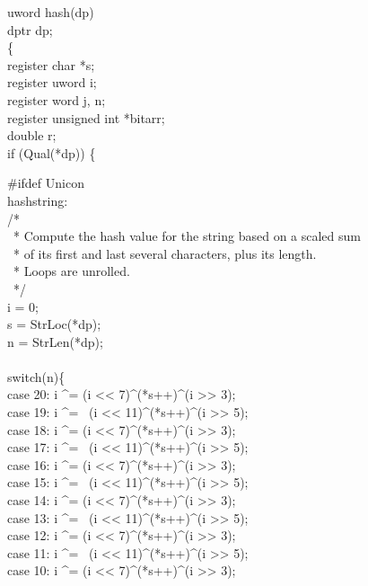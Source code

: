 %
\begin{iconcode}
uword hash(dp)\\
dptr dp;\\
\>\{\\
\>register char *s;\\
\>register uword i;\\
\>register word j, n;\\
\>register unsigned int *bitarr;\\
\>double r;\\
\>if (Qual(*dp)) \{\\
\end{iconcode}
%
\begin{specialcode}{\tt\color{blue}}
\#ifdef Unicon\\
\>hashstring:\\
\>\> /*\\
\>\>\  * Compute the hash value for the string based on a scaled sum\\
\>\>\  *  of its first and last several characters, plus its length.\\
\>\>\  *  Loops are unrolled.\\
\>\>\  */\\
\>\> i = 0;\\
\>\> s = StrLoc(*dp);\\
\>\> n = StrLen(*dp);\\
\\
\>\> switch(n)\{\\
\>\>\> case 20:  i \^{}= (i <{}< 7)\^{}(*s++)\^{}(i >{}> 3);\\
\>\>\> case 19:  i \^{}= ~(i <{}< 11)\^{}(*s++)\^{}(i >{}> 5);\\
\>\>\> case 18:  i \^{}= (i <{}< 7)\^{}(*s++)\^{}(i >{}> 3);\\
\>\>\> case 17:  i \^{}= ~(i <{}< 11)\^{}(*s++)\^{}(i >{}> 5);\\
\>\>\> case 16:  i \^{}= (i <{}< 7)\^{}(*s++)\^{}(i >{}> 3);\\
\>\>\> case 15:  i \^{}= ~(i <{}< 11)\^{}(*s++)\^{}(i >{}> 5);\\
\>\>\> case 14:  i \^{}= (i <{}< 7)\^{}(*s++)\^{}(i >{}> 3);\\
\>\>\> case 13:  i \^{}= ~(i <{}< 11)\^{}(*s++)\^{}(i >{}> 5);\\
\>\>\> case 12:  i \^{}= (i <{}< 7)\^{}(*s++)\^{}(i >{}> 3);\\
\>\>\> case 11:  i \^{}= ~(i <{}< 11)\^{}(*s++)\^{}(i >{}> 5);\\
\>\>\> case 10:  i \^{}= (i <{}< 7)\^{}(*s++)\^{}(i >{}> 3);\\

\end{specialcode}

